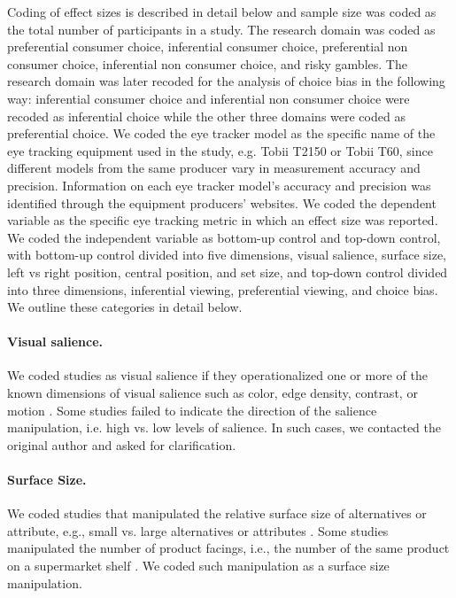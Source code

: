 \documentclass{article}
\begin{document}
Coding of effect sizes is described in detail below and sample size was coded as the total number of participants in a study. The research domain was coded as preferential consumer choice, inferential consumer choice, preferential non consumer choice, inferential non consumer choice, and risky gambles. The research domain was later recoded for the analysis of choice bias in the following way: inferential consumer choice and inferential non consumer choice were recoded as inferential choice while the other three domains were coded as preferential choice. We coded the eye tracker model as the specific name of the eye tracking equipment used in the study, e.g. Tobii T2150 or Tobii T60, since different models from the same producer vary in measurement accuracy and precision. Information on each eye tracker model's accuracy and precision was identified through the equipment producers' websites. We coded the dependent variable as the specific eye tracking metric in which an effect size was reported. We coded the independent variable as bottom-up control and top-down control, with bottom-up control divided into five dimensions, visual salience, surface size, left vs right position, central position, and set size, and top-down control divided into three dimensions, inferential viewing, preferential viewing, and choice bias. We outline these categories in detail below. 

\paragraph{Visual salience.} We coded studies as visual salience if they operationalized one or more of the known dimensions of visual salience such as color, edge density, contrast, or motion \citep{itti2000}. Some studies failed to indicate the direction of the salience manipulation, i.e. high vs. low levels of salience. In such cases, we contacted the original author and asked for clarification.

\paragraph{Surface Size.} We coded studies that manipulated the relative surface size of alternatives or attribute, e.g., small vs. large alternatives or attributes \citep{lohse1997a}. Some studies manipulated the number of product facings, i.e., the number of the same product on a supermarket shelf \citep{chandon2009a}. We coded such manipulation as a surface size manipulation. 
\end{document}
